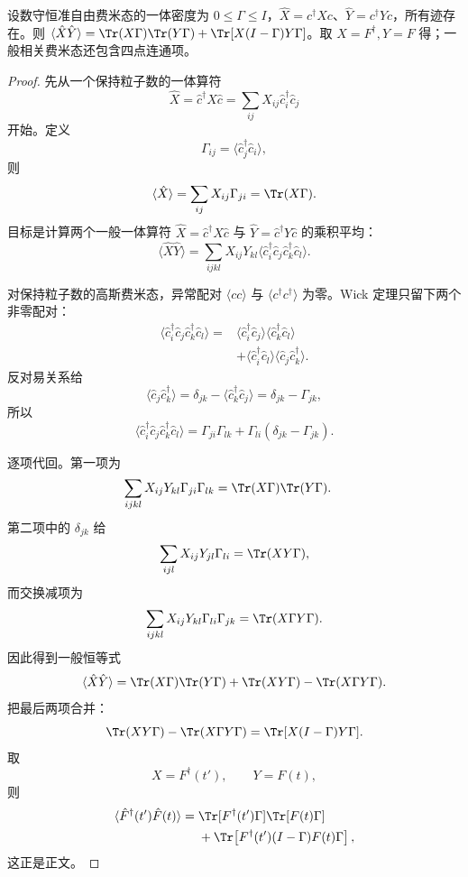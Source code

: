 \begin{lemma}[准自由费米态的一体乘积恒等式]
设数守恒准自由费米态的一体密度为 $0\le\Gamma\le I$，$\hat X=c^\dagger Xc$、$\hat Y=c^\dagger Yc$，所有迹存在。则 $\langle\hat X\hat Y\rangle=\Tr(X\Gamma)\Tr(Y\Gamma)+\Tr[X(I-\Gamma)Y\Gamma]$。取 $X=F^\dagger,Y=F$ 得；一般相关费米态还包含四点连通项。
\end{lemma}
\begin{proof}
先从一个保持粒子数的一体算符
\[
\hat X=\hat c^\dagger X\hat c
=\sum_{ij}X_{ij}\hat c_i^\dagger\hat c_j
\]
开始。定义
\[
\Gamma_{ij}=\langle\hat c_j^\dagger\hat c_i\rangle,
\]
则
\[
\langle\hat X\rangle
=\sum_{ij}X_{ij}\Gamma_{ji}
=\Tr(X\Gamma).
\]
目标是计算两个一般一体算符
$\hat X=\hat c^\dagger X\hat c$ 与
$\hat Y=\hat c^\dagger Y\hat c$ 的乘积平均：
\[
\langle\hat X\hat Y\rangle
=\sum_{ijkl}X_{ij}Y_{kl}
\langle
\hat c_i^\dagger\hat c_j
\hat c_k^\dagger\hat c_l
\rangle.
\]

对保持粒子数的高斯费米态，异常配对
$\langle cc\rangle$ 与 $\langle c^\dagger c^\dagger\rangle$ 为零。Wick 定理只留下两个非零配对：
\begin{align*}
\langle
\hat c_i^\dagger\hat c_j
\hat c_k^\dagger\hat c_l
\rangle
={}&
\langle\hat c_i^\dagger\hat c_j\rangle
\langle\hat c_k^\dagger\hat c_l\rangle\\
&+
\langle\hat c_i^\dagger\hat c_l\rangle
\langle\hat c_j\hat c_k^\dagger\rangle.
\end{align*}
反对易关系给
\[
\langle\hat c_j\hat c_k^\dagger\rangle
=\delta_{jk}-\langle\hat c_k^\dagger\hat c_j\rangle
=\delta_{jk}-\Gamma_{jk},
\]
所以
\[
\langle
\hat c_i^\dagger\hat c_j
\hat c_k^\dagger\hat c_l
\rangle
=
\Gamma_{ji}\Gamma_{lk}
+\Gamma_{li}(\delta_{jk}-\Gamma_{jk}).
\]

逐项代回。第一项为
\begin{align*}
\sum_{ijkl}X_{ij}Y_{kl}
\Gamma_{ji}\Gamma_{lk}
&=
\Tr(X\Gamma)\Tr(Y\Gamma).
\end{align*}
第二项中的 $\delta_{jk}$ 给
\[
\sum_{ijl}X_{ij}Y_{jl}\Gamma_{li}
=\Tr(XY\Gamma),
\]
而交换减项为
\[
\sum_{ijkl}X_{ij}Y_{kl}\Gamma_{li}\Gamma_{jk}
=\Tr(X\Gamma Y\Gamma).
\]
因此得到一般恒等式
\begin{equation*}
{
\langle\hat X\hat Y\rangle
=
\Tr(X\Gamma)\Tr(Y\Gamma)
+\Tr(XY\Gamma)
-\Tr(X\Gamma Y\Gamma).}
\end{equation*}
把最后两项合并：
\[
\Tr(XY\Gamma)-\Tr(X\Gamma Y\Gamma)
=
\Tr[X(I-\Gamma)Y\Gamma].
\]
取
\[
X=F^\dagger(t'),
\qquad
Y=F(t),
\]
则
\begin{align*}
\langle\hat F^\dagger(t')\hat F(t)\rangle
={}&\Tr[F^\dagger(t')\Gamma]\Tr[F(t)\Gamma]\\
&+\Tr\!\left[F^\dagger(t')(I-\Gamma)F(t)\Gamma\right],
\end{align*}
这正是正文。


\end{proof}
